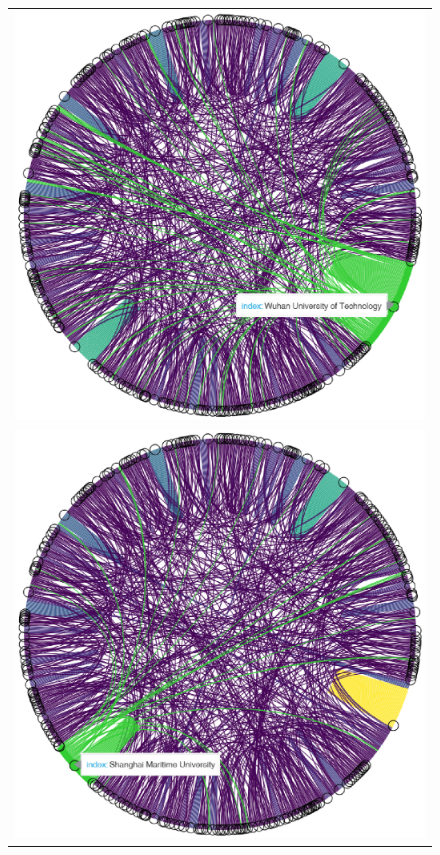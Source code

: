 \documentclass[jmse,review,accept,pdftex,moreauthors]{Definitions/mdpi}
\begin{document}
\begin{figure}[H]
\begin{tabular}{l}
	\includegraphics[height=0.3\textheight, keepaspectratio]{pics/coauthorship_inst_chord_1.eps}\\
	\includegraphics[height=0.3\textheight, keepaspectratio]{pics/coauthorship_inst_chord_2.eps}\\

\end{tabular}
\end{figure}
\end{document}
